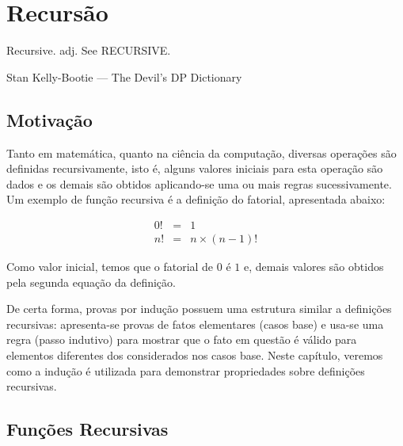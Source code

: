 \chapter{Recursão}\label{cap10}

\epigraph{Recursive. adj. See RECURSIVE.}{Stan Kelly-Bootie --- The
  Devil's DP Dictionary}

\section{Motivação}

Tanto em matemática, quanto na ciência da computação, diversas
operações são definidas recursivamente, isto é, alguns valores
iniciais para esta operação são dados e os demais são obtidos
aplicando-se uma ou mais regras sucessivamente. Um exemplo de função
recursiva é a definição do fatorial, apresentada abaixo:

\[
\begin{array}{lcl}
0! & = & 1\\
n! & = & n \times (n - 1)!
\end{array}
\]

Como valor inicial, temos que o fatorial de $0$ é $1$ e, demais
valores são obtidos pela segunda equação da definição.

De certa forma, provas por indução possuem uma estrutura similar a
definições recursivas: apresenta-se provas de fatos elementares (casos
base) e usa-se uma regra (passo indutivo) para mostrar que o fato em
questão é válido para elementos diferentes dos considerados nos casos
base. Neste capítulo, veremos como a indução é utilizada para
demonstrar propriedades sobre definições recursivas.

\section{Funções Recursivas}

